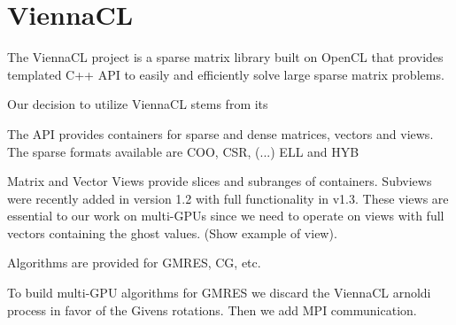 \chapter{ViennaCL}


The ViennaCL project \cite{Rupp2010a, Rupp2010} is a sparse matrix library built on OpenCL that provides templated C++ API to easily and efficiently solve large sparse matrix problems. 

Our decision to utilize ViennaCL stems from its 

The API provides containers for sparse and dense matrices, vectors and views. The sparse formats available are COO, CSR, (...) ELL and HYB

Matrix and Vector Views provide slices and subranges of containers. Subviews were recently added in version 1.2 with full functionality in v1.3. These views are essential to our work on multi-GPUs since we need to operate on views with full vectors containing the ghost values. (Show example of view). 

Algorithms are provided for GMRES, CG, etc. 

To build multi-GPU algorithms for GMRES we discard the ViennaCL arnoldi process in favor of the Givens rotations. Then we add MPI communication. 
